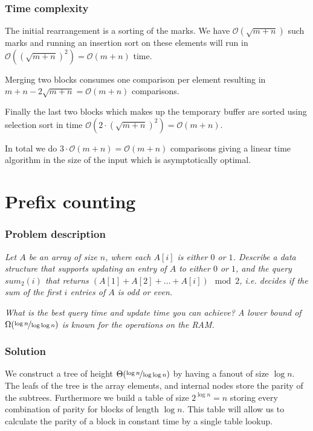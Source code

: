 \documentclass[a4paper,oneside,article,11pt]{memoir}
\begin{document}
\subsection{Time complexity}
The initial rearrangement is a sorting of the marks. We have $\mathcal{O}(\sqrt{m+n})$ such marks and running an insertion sort on these elements will run in $\mathcal{O}( (\sqrt{m+n})^2) = \mathcal{O}(m+n)$ time.

Merging two blocks consumes one comparison per element resulting in $m+n - 2\sqrt{m+n} = \mathcal{O}(m+n)$ comparisons.

Finally the last two blocks which makes up the temporary buffer are sorted using selection sort in time $\mathcal{O}(2\cdot\left(\sqrt{m+n}\right)^2) = \mathcal{O}(m+n)$.

In total we do $3\cdot\mathcal{O}(m+n) = \mathcal{O}(m+n)$ comparisons giving a linear time algorithm in the size of the input which is asymptotically optimal.


\chapter{Prefix counting}
\label{chp:prefix}
\subsection{Problem description}
\textit{Let $A$ be an array of size $n$, where each $A\left[i\right]$ is either $0$ or $1$. Describe a data structure that supports updating an entry of $A$ to either $0$ or $1$, and the query $sum_2\left(i\right)$ that returns $\left(A\left[1\right]+A\left[2\right]+\dots+A\left[i\right]\right)\mod 2$, i.e. decides if the sum of the first $i$ entries of $A$ is odd or even.}

\textit{What is the best query time and update time you can achieve? A lower bound of $\Omega(\nicefrac{\log n}{\log\log n})$ is known for the operations on the RAM.}


\subsection{Solution}
We construct a tree of height $\Theta(\nicefrac{\log n}{\log\log n})$ by having a fanout of size $\log n$. The leafs of the tree is the array elements, and internal nodes store the parity of the subtrees. Furthermore we build a table of size $2^{\log n} = n$ storing every combination of parity for blocks of length $\log n$. This table will allow us to calculate the parity of a block in constant time by a single table lookup.
\end{document}
